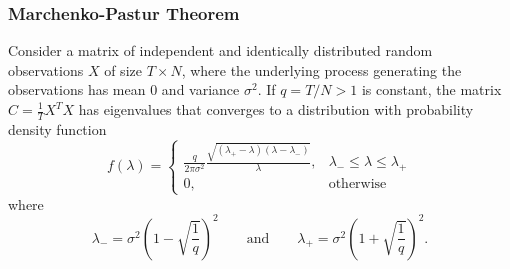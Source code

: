 \documentclass{beamer}
\begin{document}
\begin{frame}
\frametitle{Marchenko-Pastur Theorem}
\small
\begin{Theorem}
Consider a matrix of independent and identically distributed random observations $X$ of size $T\times N$, where the underlying process generating the observations has mean 0 and variance $\sigma^2$. If $q = T/N > 1$ is constant, the matrix $C = \frac{1}{T} X^T X$ has eigenvalues that converges to a distribution with probability density function
$$
f(\lambda) = \begin{cases} \frac{q}{2\pi\sigma^2} \frac{\sqrt{(\lambda_+ - \lambda)(\lambda - \lambda_-)}}{\lambda}, & \lambda_- \leq \lambda \leq \lambda_+\\ 0, & \text{otherwise}\end{cases}
$$
where
$$
\lambda_- = \sigma^2 \left(1 - \sqrt{\frac{1}{q}}\right)^2\qquad\text{and}\qquad \lambda_+ = \sigma^2 \left(1 + \sqrt{\frac{1}{q}}\right)^2.
$$
\end{Theorem}
\end{frame}
\end{document}
